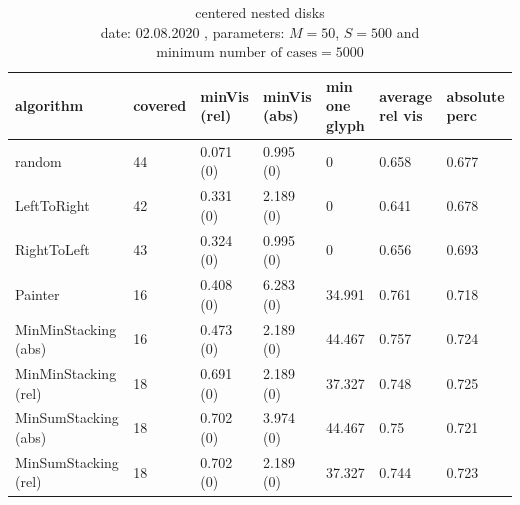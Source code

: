 \documentclass[a4paper,11pt]{article}
\begin{document}
\begin{table}[h]
  \begin{center}
    \begin{tabular}{| l || p{1.3cm} | p{1.7cm} | p{1.7cm} | p{1.5cm} | p{1.5cm} | p{1.5cm} |}
      \hline
      algorithm            & covered & minVis (rel) & minVis (abs) & min one glyph & average rel vis & absolute perc \\
      \hline
      random               & 44      & 0.071 (0)    & 0.995 (0)    & 0             & 0.658           & 0.677         \\

      LeftToRight          & 42      & 0.331 (0)    & 2.189 (0)    & 0             & 0.641           & 0.678         \\

      RightToLeft          & 43      & 0.324 (0)    & 0.995 (0)    & 0             & 0.656           & 0.693         \\

      Painter              & 16      & 0.408 (0)    & 6.283 (0)    & 34.991        & 0.761           & 0.718         \\

      MinMinStacking (abs) & 16      & 0.473 (0)    & 2.189 (0)    & 44.467        & 0.757           & 0.724         \\

      MinMinStacking (rel) & 18      & 0.691 (0)    & 2.189 (0)    & 37.327        & 0.748           & 0.725         \\

      MinSumStacking (abs) & 18      & 0.702 (0)    & 3.974 (0)    & 44.467        & 0.75            & 0.721         \\

      MinSumStacking (rel) & 18      & 0.702 (0)    & 2.189 (0)    & 37.327        & 0.744           & 0.723         \\

      \hline
    \end{tabular}
  \end{center}
  \caption{centered nested disks\\
    date: 02.08.2020  , parameters: $M=50$, $S=500$ and $\text{minimum number of cases}=5000$  }
\end{table}
\end{document}
